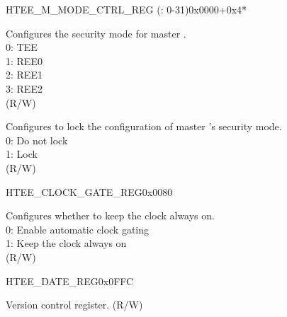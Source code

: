 \begin{register}{H}{TEE\_M\_MODE\_CTRL\_REG (: 0-31)}{0x0000+0x4*}\label{regdesc:TEEMNMODECTRLREG}
%
%
%
\regnewline%
\begin{regdesc}\begin{reglist}
\label{fielddesc:TEEMNMODE}\item [TEE\_M\regindex{n}\_MODE] Configures the security mode for master .\\ 
0: TEE \\
1: REE0 \\
2: REE1 \\
3: REE2  \\
(R/W)
\label{fielddesc:TEEMNLOCK}\item [TEE\_M\regindex{n}\_LOCK] Configures to lock the configuration of master 's security mode.\\
0: Do not lock \\ 
1: Lock  \\ 
(R/W)

\end{reglist}\end{regdesc}
\end{register}


\begin{register}{H}{TEE\_CLOCK\_GATE\_REG}{0x0080}\label{regdesc:TEECLOCKGATEREG}
%
%
\regnewline%
\begin{regdesc}\begin{reglist}
\label{fielddesc:TEECLKEN}\item [TEE\_CLK\_EN] Configures whether to keep the clock always on.\\ 
0: Enable automatic clock gating \\ 
1: Keep the clock always on  \\ (R/W)
\end{reglist}\end{regdesc}
\end{register}


\begin{register}{H}{TEE\_DATE\_REG}{0x0FFC}\label{regdesc:TEEDATEREG}
%
%
\regnewline%
\begin{regdesc}\begin{reglist}
\label{fielddesc:TEEDATE}\item [TEE\_DATE] Version control register. (R/W)
\end{reglist}\end{regdesc}
\end{register}


